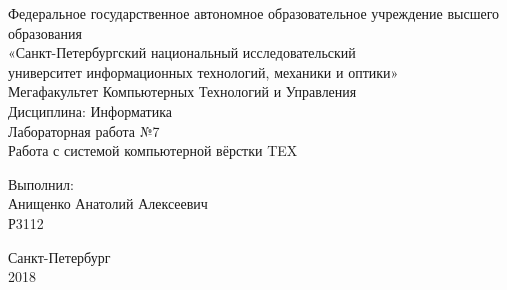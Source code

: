 \begin{center}
	Федеральное государственное автономное образовательное учреждение высшего образования \\
	«Санкт-Петербургский национальный исследовательский \\
	университет информационных технологий, механики и оптики»\\
	\vspace{1cm}
	Мегафакультет Компьютерных Технологий и Управления \\
	Дисциплина: Информатика \\
	\vspace{5cm}
	Лабораторная работа №7 \\
	Работа с системой компьютерной вёрстки TEX
	\vspace{10cm}
\end{center}

\begin{flushright}
	Выполнил:\\
	Анищенко Анатолий Алексеевич \\
	Р3112 \\
\end{flushright}

\null\vfill

\begin{center}
	Санкт-Петербург \\ 
	2018
\end{center}